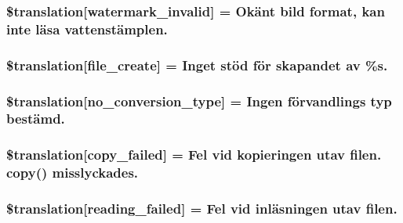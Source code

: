 \subsubsection[{\$translation}]{\setlength{\rightskip}{0pt plus 5cm}\$translation\mbox{[}\textquotesingle{}watermark\+\_\+invalid\textquotesingle{}\mbox{]} = \textquotesingle{}Okänt bild format, kan inte läsa vattenstämplen.\textquotesingle{}}\label{class_8upload_8sv___s_e_8php_ac336e7a5701e47ba4a05e9e498a3cc44}
\hypertarget{class_8upload_8sv___s_e_8php_a1ecb4673e4fb69e06b3f20b65cecf30a}{}
\subsubsection[{\$translation}]{\setlength{\rightskip}{0pt plus 5cm}\$translation\mbox{[}\textquotesingle{}file\+\_\+create\textquotesingle{}\mbox{]} = \textquotesingle{}Inget stöd för skapandet av \%s.\textquotesingle{}}\label{class_8upload_8sv___s_e_8php_a1ecb4673e4fb69e06b3f20b65cecf30a}
\hypertarget{class_8upload_8sv___s_e_8php_a4712d7ec28e9a7f17eb3338af2358363}{}
\subsubsection[{\$translation}]{\setlength{\rightskip}{0pt plus 5cm}\$translation\mbox{[}\textquotesingle{}no\+\_\+conversion\+\_\+type\textquotesingle{}\mbox{]} = \textquotesingle{}Ingen förvandlings typ bestämd.\textquotesingle{}}\label{class_8upload_8sv___s_e_8php_a4712d7ec28e9a7f17eb3338af2358363}
\hypertarget{class_8upload_8sv___s_e_8php_a783c9358bcf54a054545b50098bc679b}{}
\subsubsection[{\$translation}]{\setlength{\rightskip}{0pt plus 5cm}\$translation\mbox{[}\textquotesingle{}copy\+\_\+failed\textquotesingle{}\mbox{]} = \textquotesingle{}Fel vid kopieringen utav filen. copy() misslyckades.\textquotesingle{}}\label{class_8upload_8sv___s_e_8php_a783c9358bcf54a054545b50098bc679b}
\hypertarget{class_8upload_8sv___s_e_8php_a01bea14c9fd5f353f62db44beabfcd42}{}
\subsubsection[{\$translation}]{\setlength{\rightskip}{0pt plus 5cm}\$translation\mbox{[}\textquotesingle{}reading\+\_\+failed\textquotesingle{}\mbox{]} = \textquotesingle{}Fel vid inläsningen utav filen.\textquotesingle{}}\label{class_8upload_8sv___s_e_8php_a01bea14c9fd5f353f62db44beabfcd42}
